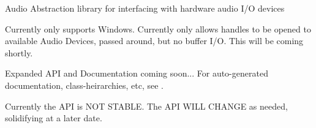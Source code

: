 Audio Abstraction library for interfacing with hardware audio I/\-O devices

Currently only supports Windows. Currently only allows handles to be opened to available Audio Devices, passed around, but no buffer I/\-O. This will be coming shortly.

Expanded A\-P\-I and Documentation coming soon... For auto-\/generated documentation, class-\/heirarchies, etc, see .

Currently the A\-P\-I is N\-O\-T S\-T\-A\-B\-L\-E. The A\-P\-I W\-I\-L\-L C\-H\-A\-N\-G\-E as needed, solidifying at a later date. 